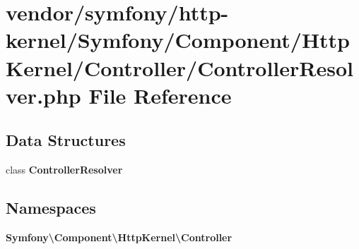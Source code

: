 \section{vendor/symfony/http-\/kernel/\+Symfony/\+Component/\+Http\+Kernel/\+Controller/\+Controller\+Resolver.php File Reference}
\label{_controller_resolver_8php}
\subsection*{Data Structures}
\begin{DoxyCompactItemize}
\item 
class {\bf Controller\+Resolver}
\end{DoxyCompactItemize}
\subsection*{Namespaces}
\begin{DoxyCompactItemize}
\item 
 {\bf Symfony\textbackslash{}\+Component\textbackslash{}\+Http\+Kernel\textbackslash{}\+Controller}
\end{DoxyCompactItemize}
